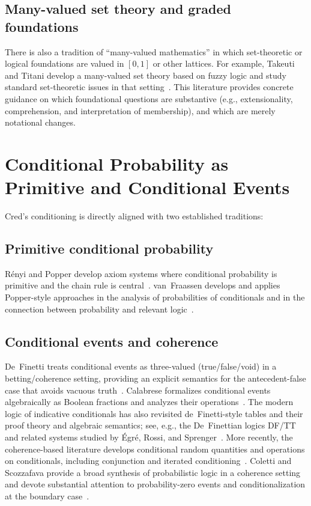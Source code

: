 \documentclass[11pt,a4paper]{article}
\begin{document}
\subsection{Many-valued set theory and graded foundations}

There is also a tradition of ``many-valued mathematics'' in which set-theoretic
or logical foundations are valued in $[0,1]$ or other lattices.  For example,
Takeuti and Titani develop a many-valued set theory based on fuzzy logic and
study standard set-theoretic issues in that setting~\cite{takeuti1984}.
This literature provides concrete guidance on which foundational questions are
substantive (e.g., extensionality, comprehension, and interpretation of
membership), and which are merely notational changes.

\section{Conditional Probability as Primitive and Conditional Events}

Cred's conditioning is directly aligned with two established traditions:

\subsection{Primitive conditional probability}

R\'enyi and Popper develop axiom systems where conditional probability is
primitive and the chain rule is central~\cite{renyi1955,popper1959}.
van~Fraassen develops and applies Popper-style approaches in the analysis of
probabilities of conditionals and in the connection between probability and
relevant logic~\cite{vanfraassen1976,vanfraassen1983}.

\subsection{Conditional events and coherence}

De~Finetti treats conditional events as three-valued (true/false/void) in a
betting/coherence setting, providing an explicit semantics for the antecedent-false
case that avoids vacuous truth~\cite{definetti1936,definetti1937}.
Calabrese formalizes conditional events algebraically as Boolean fractions and
analyzes their operations~\cite{calabrese1987}.
The modern logic of indicative conditionals has also revisited de~Finetti-style
tables and their proof theory and algebraic semantics; see, e.g., the
De~Finettian logics DF/TT and related systems studied by \'Egr\'e, Rossi, and
Sprenger~\cite{egre2021}.
More recently, the coherence-based literature develops conditional random
quantities and operations on conditionals, including conjunction and iterated
conditioning~\cite{gilio2014,gilio2013}.  Coletti and Scozzafava provide a broad
synthesis of probabilistic logic in a coherence setting and devote substantial
attention to probability-zero events and conditionalization at the boundary
case~\cite{coletti2002}.
\end{document}
